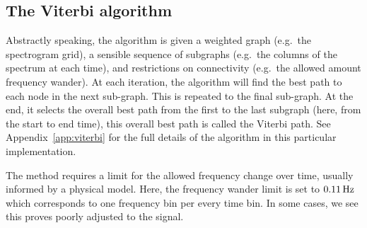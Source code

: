 \documentclass[paper-main.tex]{subfiles}
\begin{document}




\subsection{The Viterbi algorithm}
\label{sec:viterbi}

Abstractly speaking, the algorithm is given a weighted graph (e.g.\ the spectrogram grid), a sensible sequence of subgraphs (e.g.\ the columns of the spectrum at each time), and restrictions on connectivity (e.g.\ the allowed amount frequency wander). 
At each iteration, the algorithm will find the best path to each node in the next sub-graph. 
This is repeated to the final sub-graph. 
At the end, it selects the overall best path from the first to the last subgraph (here, from the start to end time), this overall best path is called the Viterbi path. 
See Appendix~\ref{app:viterbi} for the full details of the algorithm in this particular implementation.

The method requires a limit for the allowed frequency change over time, usually informed by a physical model. 
Here, the frequency wander limit is set to $0.11\,{\rm Hz}$ which corresponds to one frequency bin per every time bin. 
In some cases, we see this proves poorly adjusted to the signal. 
\end{document}
